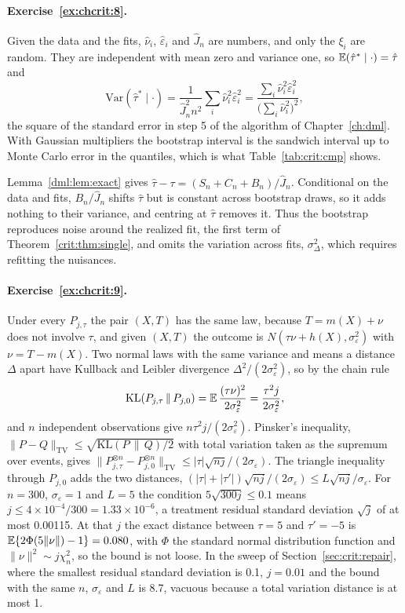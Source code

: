\paragraph{Exercise~\ref{ex:chcrit:8}.} Given the data and the fits, $\hat\nu_i$, $\hat\varepsilon_i$ and $\hat J_n$ are numbers, and only the $\xi_i$ are random. They are independent with mean zero and variance one, so $\mathbb{E}(\hat\tau^* \mid \cdot) = \hat\tau$ and
\[
\mathrm{Var}(\hat\tau^* \mid \cdot) = \frac{1}{\hat J_n^2 n^2}\sum_i\hat\nu_i^2\hat\varepsilon_i^2 = \frac{\sum_i\hat\nu_i^2\hat\varepsilon_i^2}{\bigl(\sum_i\hat\nu_i^2\bigr)^2},
\]
the square of the standard error in step 5 of the algorithm of Chapter~\ref{ch:dml}. With Gaussian multipliers the bootstrap interval is the sandwich interval up to Monte Carlo error in the quantiles, which is what Table~\ref{tab:crit:cmp} shows.

Lemma~\ref{dml:lem:exact} gives $\hat\tau-\tau=(S_n+C_n+B_n)/\hat J_n$. Conditional on the data and fits, $B_n/\hat J_n$ shifts $\hat\tau$ but is constant across bootstrap draws, so it adds nothing to their variance, and centring at $\hat\tau$ removes it. Thus the bootstrap reproduces noise around the realized fit, the first term of Theorem~\ref{crit:thm:single}, and omits the variation across fits, $\sigma_\Delta^2$, which requires refitting the nuisances.

\paragraph{Exercise~\ref{ex:chcrit:9}.} Under every $P_{j,\tau}$ the pair $(X, T)$ has the same law, because $T = m(X) + \nu$ does not involve $\tau$, and given $(X, T)$ the outcome is $N(\tau\nu + h(X), \sigma_\varepsilon^2)$ with $\nu = T - m(X)$. Two normal laws with the same variance and means a distance $\Delta$ apart have Kullback and Leibler divergence $\Delta^2/(2\sigma_\varepsilon^2)$, so by the chain rule
\[
\mathrm{KL}(P_{j,\tau}\,\|\,P_{j,0}) = \mathbb{E}\,\frac{(\tau\nu)^2}{2\sigma_\varepsilon^2} = \frac{\tau^2 j}{2\sigma_\varepsilon^2},
\]
and $n$ independent observations give $n\tau^2 j/(2\sigma_\varepsilon^2)$. Pinsker's inequality, $\|P - Q\|_{\mathrm{TV}} \le \sqrt{\mathrm{KL}(P\,\|\,Q)/2}$ with total variation taken as the supremum over events, gives $\|P_{j,\tau}^{\otimes n} - P_{j,0}^{\otimes n}\|_{\mathrm{TV}} \le |\tau|\sqrt{nj}/(2\sigma_\varepsilon)$. The triangle inequality through $P_{j,0}$ adds the two distances, $(|\tau| + |\tau'|)\sqrt{nj}/(2\sigma_\varepsilon) \le L\sqrt{nj}/\sigma_\varepsilon$. For $n = 300$, $\sigma_\varepsilon = 1$ and $L = 5$ the condition $5\sqrt{300j} \le 0.1$ means $j \le 4\times 10^{-4}/300 = 1.33\times 10^{-6}$, a treatment residual standard deviation $\sqrt j$ of at most 0.00115. At that $j$ the exact distance between $\tau = 5$ and $\tau' = -5$ is $\mathbb{E}\{2\Phi(5\|\nu\|) - 1\} = 0.080$, with $\Phi$ the standard normal distribution function and $\|\nu\|^2 \sim j\chi^2_n$, so the bound is not loose. In the sweep of Section~\ref{sec:crit:repair}, where the smallest residual standard deviation is 0.1, $j = 0.01$ and the bound with the same $n$, $\sigma_\varepsilon$ and $L$ is 8.7, vacuous because a total variation distance is at most 1.

